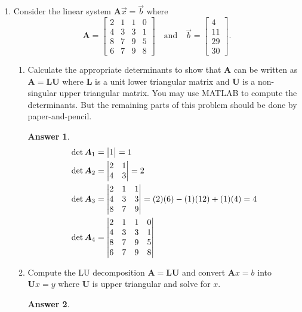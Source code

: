 \documentclass{article}
\theoremstyle{definition}
\newtheorem*{answer}{Answer}
\newcommand{\mat}[1]{\bm{#1}}
\begin{document}
\begin{enumerate}[leftmargin=\labelsep]
	\item Consider the linear system \(\mat{A}\vec{x} = \vec{b}\) where
	      \[
		      \mat{A} = \begin{bmatrix}
			      2 & 1 & 1 & 0 \\
			      4 & 3 & 3 & 1 \\
			      8 & 7 & 9 & 5 \\
			      6 & 7 & 9 & 8
		      \end{bmatrix}
		      \quad \text{and} \quad
		      \vec{b} = \begin{bmatrix}
			      4 \\ 11 \\ 29 \\ 30
		      \end{bmatrix}.
	      \]
	      \begin{enumerate}
		      \item Calculate the appropriate determinants to show that \(\mat{A}\) can be written as \(\mat{A} = \mat{L}\mat{U}\) where \(\mat{L}\) is a unit lower triangular matrix and \(\mat{U}\) is a non-singular upper triangular matrix. You may use MATLAB to compute the determinants. But the remaining parts of this problem should be done by paper-and-pencil.
		            \begin{answer}
						\begin{align*}
							\det\mat{A}_1 & = \mqty|1| = 1 \\
							\det\mat{A}_2 & = \mqty|2 & 1 \\ 4 & 3| = 2 \\
							\det\mat{A}_3 & = \mqty|2 & 1 & 1 \\ 4 & 3 & 3 \\ 8 & 7 & 9| = (2)(6)-(1)(12)+(1)(4) = 4 \\
							\det\mat{A}_4 & = \mqty|2 & 1 & 1 & 0 \\ 4 & 3 & 3 & 1 \\ 8 & 7 & 9 & 5 \\ 6 & 7 & 9 & 8|
						\end{align*}
		            \end{answer}

		      \item Compute the LU decomposition \(\mat{A} = \mat{L}\mat{U}\) and convert \(\mat{A}x = b\) into \(\mat{U}x = y\) where \(\mat{U}\) is upper triangular and solve for \(x\).
		            \begin{answer}

		            \end{answer}


\end{enumerate}
\end{enumerate}
\end{document}
